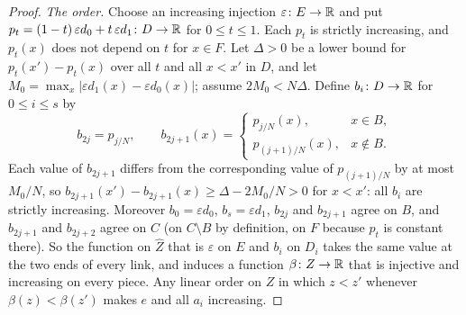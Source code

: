 \begin{proof}
\emph{The order.} Choose an increasing injection $\varepsilon\colon E\to\mathbb{R}$
and put $p_t=(1-t)\,\varepsilon d_0+t\,\varepsilon d_1\colon D\to\mathbb{R}$ for
$0\le t\le 1$. Each $p_t$ is strictly increasing, and $p_t(x)$ does not
depend on $t$ for $x\in F$. Let $\Delta>0$ be a lower bound for
$p_t(x')-p_t(x)$ over all $t$ and all $x<x'$ in $D$, and let
$M_0=\max_x|\varepsilon d_1(x)-\varepsilon d_0(x)|$; assume $2M_0<N\Delta$.
Define $b_i\colon D\to\mathbb{R}$ for $0\le i\le s$ by
\[
 b_{2j}=p_{j/N},\qquad
 b_{2j+1}(x)=\begin{cases}p_{j/N}(x),&x\in B,\\ p_{(j+1)/N}(x),&x\notin B.\end{cases}
\]
Each value of $b_{2j+1}$ differs from the corresponding value of $p_{(j+1)/N}$
by at most $M_0/N$, so $b_{2j+1}(x')-b_{2j+1}(x)\ge\Delta-2M_0/N>0$ for
$x<x'$: all $b_i$ are strictly increasing. Moreover $b_0=\varepsilon d_0$,
$b_s=\varepsilon d_1$, $b_{2j}$ and $b_{2j+1}$ agree on $B$, and $b_{2j+1}$
and $b_{2j+2}$ agree on $C$ (on $C\setminus B$ by definition, on $F$ because
$p_t$ is constant there). So the function on $\widehat Z$ that is
$\varepsilon$ on $E$ and $b_i$ on $D_i$ takes the same value at the two ends
of every link, and induces a function $\beta\colon Z\to\mathbb{R}$ that is injective
and increasing on every piece. Any linear order on $Z$ in which $z<z'$
whenever $\beta(z)<\beta(z')$ makes $e$ and all $a_i$ increasing.
\end{proof}
